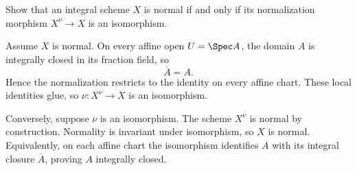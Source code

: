 \begin{problem}\label{prob:vi28-05}
Show that an integral scheme \(X\) is normal if and only if its normalization morphism \(X^\nu\to X\) is an isomorphism.

\end{problem}

\ifdefined\FullProblemDossiers
\begin{solution}
Assume \(X\) is normal. On every affine open \(U=\Spec A\), the domain \(A\) is integrally closed in its fraction field, so
\[
\overline A=A.
\]
Hence the normalization restricts to the identity on every affine chart. These local identities glue, so \(\nu:X^\nu\to X\) is an isomorphism.

Conversely, suppose \(\nu\) is an isomorphism. The scheme \(X^\nu\) is normal by construction. Normality is invariant under isomorphism, so \(X\) is normal. Equivalently, on each affine chart the isomorphism identifies \(A\) with its integral closure \(\overline A\), proving \(A\) integrally closed.
\end{solution}
\fi
